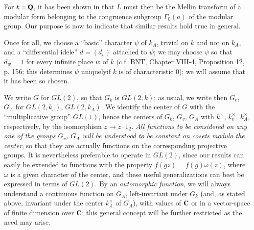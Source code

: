For $k=\mathbf{Q}$, it has been shown in \cite{art21-key2} that $L$ must then be the Mellin transform of a modular form belonging to the congruence subgroup $\Gamma_{0}(a)$ of the modular group. Our purpose is now to indicate that similar results hold true in general.

Once for all, we choose a ``basic'' character $\psi$ of $k_{A}$, trivial on $k$ and not on $k_{A}$, and a ``differential idele'' $d=(d_{v})$ attached to $\psi$; we may choose $\psi$ so that $d_{w}=1$ for every infinite place $w$ of $k$ (c.f. BNT, Chapter VIII-4, Proposition 12, p. 156; this determines $\psi$ uniquely\pageoriginale if $k$ is of characteristic 0); we will assume that it has been so chosen.

We write $G$ for $GL(2)$, so that $G_{k}$ is $GL(2,k)$; as usual, we write then $G_{v}$, $G_{A}$ for $GL(2,k_{v})$, $GL(2,k_{A})$. We identify the center of $G$ with the ``multiplicative group'' $GL(1)$, hence the centers of $G_{k}$, $G_{v}$, $G_{A}$ with $k^{\times}$, $k^{\times}_{v}$, $k^{\times}_{A}$, respectively, by the isomorphism $z\to z\cdot 1_{2}$. {\em All functions to be considered on any one of the groups $G_{v}$, $G_{A}$ will be understood to be constant on cosets modulo the center}, so that they are actually functions on the corresponding projective groups. It is nevertheless preferable to operate in $GL(2)$, since our results can easily be extended to functions with the property $f(gz)=f(g)\omega(z)$, where $\omega$ is a given character of the center, and these useful generalizations can best be expressed in terms of $GL(2)$. By an {\em automorphic function}, we will always understand a continuous function on $G_{A}$, left-invariant under $G_{k}$ (and, as stated above, invariant under the center $k^{\times}_{A}$ of $G_{A}$), with values of $\mathbf{C}$ or in a vector-space of finite dimension over $\mathbf{C}$; this general concept will be further restricted as the need may arise.


